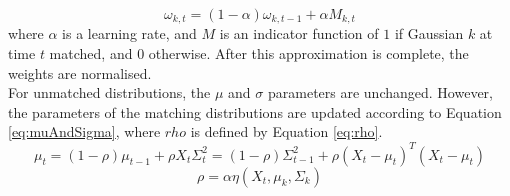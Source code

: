 \begin{equation}
    \label{eq:priors}
    \omega_{k,t} = (1-\alpha)\omega_{k,t-1} + \alpha M_{k,t}
\end{equation}
where $\alpha$ is a learning rate, and $M$ is an indicator function of $1$ if Gaussian $k$ at time $t$ matched, and $0$ otherwise. After this approximation is complete, the weights are normalised.
\smallskip \\ \indent
For unmatched distributions, the $\mu$ and $\sigma$ parameters are unchanged. However, the parameters of the matching distributions are updated according to Equation \ref{eq:muAndSigma}, where $rho$ is defined by Equation \ref{eq:rho}.
\begin{subequations}
    \label{eq:muAndSigma}
    \begin{equation}
        \mu_t = (1 - \rho) \mu_{t-1} + \rho X_t
    \end{equation}
    \begin{equation}
        \Sigma^2_t = (1 - \rho) \Sigma^2_{t-1} + \rho(X_t - \mu_t)^T(X_t - \mu_t)
    \end{equation}
\end{subequations}
\begin{equation}
    \label{eq:rho}
    \rho = \alpha \eta(X_t, \mu_k, \Sigma_k)
\end{equation}

\setlength{\leftskip}{0cm}
